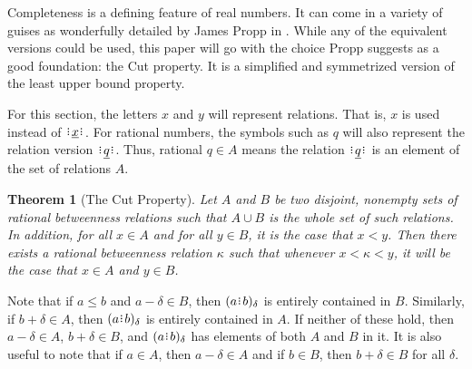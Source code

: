 \documentclass[12pt]{article}
\newtheorem{theorem}{Theorem}[section]
\begin{document}
Completeness is a defining feature of real numbers. It can come in a variety of guises as wonderfully detailed by James Propp in \cite{propp}. While any of the equivalent versions could be used, this paper will go with the choice Propp suggests as a good foundation:  the Cut property. It is a simplified and symmetrized version of the least upper bound property. 

For this section, the letters $x$ and $y$ will represent relations. That is, $x$ is used instead of $\xrel$. For rational numbers, the symbols such as $q$ will also represent the relation version $\xrel[q]$. Thus, rational $q \in A$ means the relation $\xrel[q]$ is an element of the set of relations $A$. 

\begin{theorem}[The Cut Property] 
Let $A$ and $B$ be two disjoint, nonempty sets of rational betweenness relations such that $A \cup B$ is the whole set of such relations. In addition, for all $x \in A$ and for all $y \in B$, it is the case that $x < y$. Then there exists a rational betweenness relation $\kappa$ such that whenever $x < \kappa < y$, it will be the case that $ x \in A$ and $y \in B$.
\end{theorem}

Note that if $a \leq b$ and $a-\delta \in B$, then $\halo{a\rint b}$ is entirely contained in $B$. Similarly, if $b + \delta \in A$, then $\halo{a\rint b}$ is entirely contained in $A$. If neither of these hold, then $a-\delta \in A$, $b+\delta \in B$, and $\halo{a\rint b}$ has elements of both $A$ and $B$ in it. It is also useful to note that if $a \in A$, then $a-\delta \in A$ and if $b \in B$, then $b+\delta \in B$ for all $\delta$.
\end{document}
